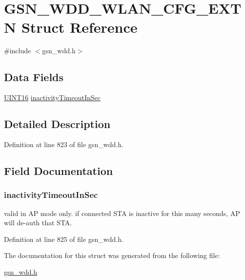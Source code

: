 \hypertarget{a00303}{
\section{GSN\_\-WDD\_\-WLAN\_\-CFG\_\-EXTN Struct Reference}
\label{a00303}
}


{\ttfamily \#include $<$gsn\_\-wdd.h$>$}

\subsection*{Data Fields}
\begin{DoxyCompactItemize}
\item 
\hyperlink{a00660_ga09f1a1fb2293e33483cc8d44aefb1eb1}{UINT16} \hyperlink{a00303_a6f21209eb61935400e9b58ac8c43913c}{inactivityTimeoutInSec}
\end{DoxyCompactItemize}


\subsection{Detailed Description}


Definition at line 823 of file gsn\_\-wdd.h.



\subsection{Field Documentation}
\hypertarget{a00303_a6f21209eb61935400e9b58ac8c43913c}{
\subsubsection[{inactivityTimeoutInSec}]{ {\bf inactivityTimeoutInSec}}}
\label{a00303_a6f21209eb61935400e9b58ac8c43913c}
valid in AP mode only. if connected STA is inactive for this many seconds, AP will de-\/auth that STA. 

Definition at line 825 of file gsn\_\-wdd.h.



The documentation for this struct was generated from the following file:\begin{DoxyCompactItemize}
\item 
\hyperlink{a00603}{gsn\_\-wdd.h}\end{DoxyCompactItemize}
